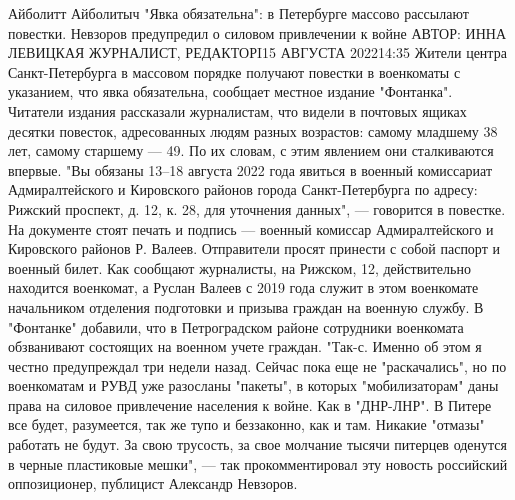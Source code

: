 Айболитт Айболитыч
"Явка обязательна": в Петербурге массово рассылают повестки. Невзоров предупредил о силовом привлечении к войне
АВТОР: ИННА ЛЕВИЦКАЯ ЖУРНАЛИСТ, РЕДАКТОРI15 АВГУСТА 202214:35
Жители центра Санкт-Петербурга в массовом порядке получают повестки в военкоматы с указанием, что явка обязательна, сообщает местное издание "Фонтанка". Читатели издания рассказали журналистам, что видели в почтовых ящиках десятки повесток, адресованных людям разных возрастов: самому младшему 38 лет, самому старшему — 49. По их словам, с этим явлением они сталкиваются впервые.
"Вы обязаны 13–18 августа 2022 года явиться в военный комиссариат Адмиралтейского и Кировского районов города Санкт-Петербурга по адресу: Рижский проспект, д. 12, к. 28, для уточнения данных", — говорится в повестке. На документе стоят печать и подпись — военный комиссар Адмиралтейского и Кировского районов Р. Валеев. Отправители просят принести с собой паспорт и военный билет.
Как сообщают журналисты, на Рижском, 12, действительно находится военкомат, а Руслан Валеев с 2019 года служит в этом военкомате начальником отделения подготовки и призыва граждан на военную службу. В "Фонтанке" добавили, что в Петроградском районе сотрудники военкомата обзванивают состоящих на военном учете граждан.
"Так-с. Именно об этом я честно предупреждал три недели назад. Сейчас пока еще не "раскачались", но по военкоматам и РУВД уже разосланы "пакеты", в которых "мобилизаторам" даны права на силовое привлечение населения к войне. Как в "ДНР-ЛНР". В Питере все будет, разумеется, так же тупо и беззаконно, как и там. Никакие "отмазы" работать не будут. За свою трусость, за свое молчание тысячи питерцев оденутся в черные пластиковые мешки", — так прокомментировал эту новость российский оппозиционер, публицист Александр Невзоров.
